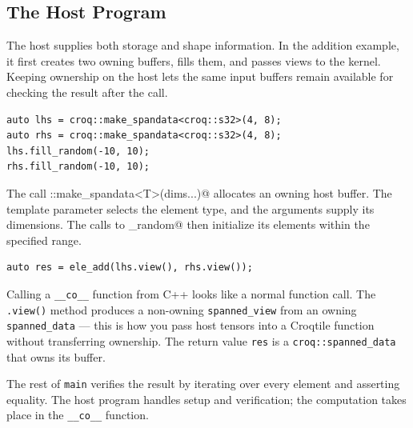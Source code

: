 \subsection*{The Host Program}

The host supplies both storage and shape information. In the addition example, it first creates two owning buffers, fills them, and passes views to the kernel. Keeping ownership on the host lets the same input buffers remain available for checking the result after the call.

\begin{lstlisting}[language=croqtile,caption={Creating the shaped inputs}]
auto lhs = croq::make_spandata<croq::s32>(4, 8);
auto rhs = croq::make_spandata<croq::s32>(4, 8);
lhs.fill_random(-10, 10);
rhs.fill_random(-10, 10);
\end{lstlisting}

The call \co@croq::make_spandata<T>(dims...)@ allocates an owning host buffer. The template parameter selects the element type, and the arguments supply its dimensions. The calls to \co@fill_random@ then initialize its elements within the specified range.

\begin{lstlisting}[language=croqtile,caption={Calling the kernel}]
auto res = ele_add(lhs.view(), rhs.view());
\end{lstlisting}

Calling a \texttt{\_\_co\_\_} function from C++ looks like a normal function call. The \texttt{.view()} method produces a non-owning \texttt{spanned\_view} from an owning \texttt{spanned\_data} --- this is how you pass host tensors into a Croqtile function without transferring ownership. The return value \texttt{res} is a \texttt{croq:\allowbreak{}:\allowbreak{}spanned\_\allowbreak{}data} that owns its buffer.

The rest of \texttt{main} verifies the result by iterating over every element and asserting equality. The host program handles setup and verification; the computation takes place in the \texttt{\_\_co\_\_} function.
